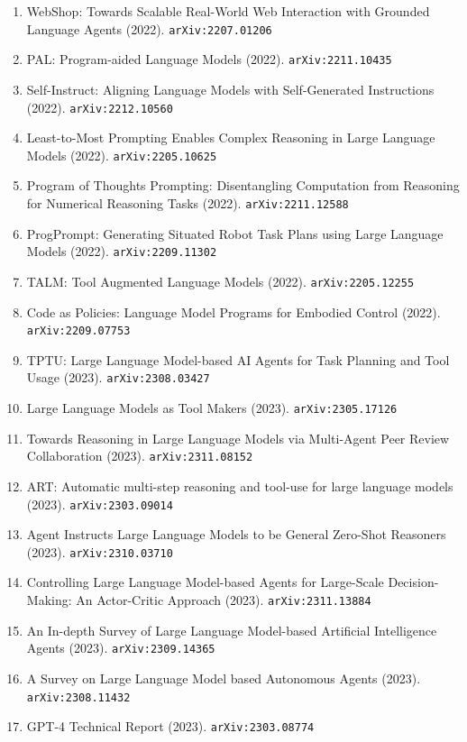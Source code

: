 \documentclass[11pt]{article}
\begin{document}
\begin{enumerate}
  Models (2022). \texttt{arXiv:2207.05608}
  \item WebShop: Towards Scalable Real-World Web Interaction with Grounded
  Language Agents (2022). \texttt{arXiv:2207.01206}
  \item PAL: Program-aided Language Models (2022). \texttt{arXiv:2211.10435}
  \item Self-Instruct: Aligning Language Models with Self-Generated Instructions (2022). \texttt{arXiv:2212.10560}
  \item Least-to-Most Prompting Enables Complex Reasoning in Large Language
  Models (2022). \texttt{arXiv:2205.10625}
  \item Program of Thoughts Prompting: Disentangling Computation from Reasoning
  for Numerical Reasoning Tasks (2022). \texttt{arXiv:2211.12588}
  \item ProgPrompt: Generating Situated Robot Task Plans using Large Language
  Models (2022). \texttt{arXiv:2209.11302}
  \item TALM: Tool Augmented Language Models (2022). \texttt{arXiv:2205.12255}
  \item Code as Policies: Language Model Programs for Embodied Control (2022). \texttt{arXiv:2209.07753}
  \item TPTU: Large Language Model-based AI Agents for Task Planning and Tool Usage (2023). \texttt{arXiv:2308.03427}
  \item Large Language Models as Tool Makers (2023). \texttt{arXiv:2305.17126}
  \item Towards Reasoning in Large Language Models via Multi-Agent Peer Review
  Collaboration (2023). \texttt{arXiv:2311.08152}
  \item ART: Automatic multi-step reasoning and tool-use for large language
  models (2023). \texttt{arXiv:2303.09014}
  \item Agent Instructs Large Language Models to be General Zero-Shot Reasoners (2023). \texttt{arXiv:2310.03710}
  \item Controlling Large Language Model-based Agents for Large-Scale
  Decision-Making: An Actor-Critic Approach (2023). \texttt{arXiv:2311.13884}
  \item An In-depth Survey of Large Language Model-based Artificial Intelligence
  Agents (2023). \texttt{arXiv:2309.14365}
  \item A Survey on Large Language Model based Autonomous Agents (2023). \texttt{arXiv:2308.11432}
  \item GPT-4 Technical Report (2023). \texttt{arXiv:2303.08774}

\end{enumerate}
\end{document}
